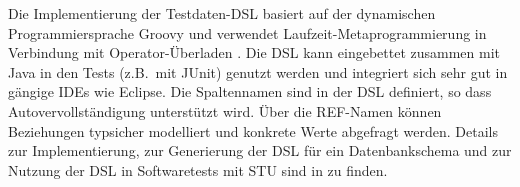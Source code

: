 Die Implementierung der Testdaten-DSL basiert auf 
%
der dynamischen Programmiersprache Groovy 
%
und verwendet Laufzeit-Metaprogrammierung in Verbindung mit Operator-Überladen \cite{MT:Moll:2013}. Die DSL kann eingebettet zusammen mit Java in den Tests (z.B.~mit JUnit) genutzt werden und integriert sich sehr gut in gängige IDEs wie Eclipse. Die Spaltennamen sind in der DSL definiert, so dass Autovervollständigung unterstützt wird. 
%
%
Über die REF-Namen können Beziehungen typsicher modelliert und konkrete Werte abgefragt werden. 
%
Details zur Implementierung, zur Generierung der DSL für ein Datenbankschema und zur Nutzung der DSL in Softwaretests mit STU sind in \cite{MT:Moll:2013} zu finden.


